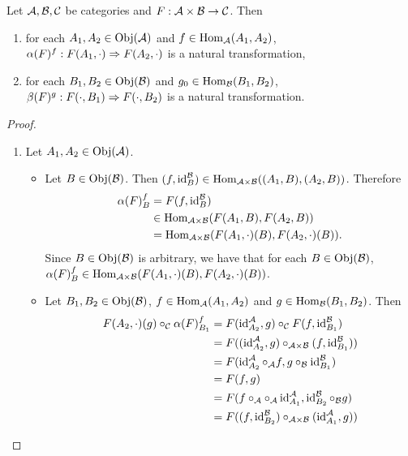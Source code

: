 \documentclass{book}
\begin{document}
	\begin{ex} 
		Let $\mathcal{A}, \mathcal{B}, \mathcal{C}$ be categories and $F :\mathcal{A} \times \mathcal{B} \rightarrow \mathcal{C}$. Then
		\begin{enumerate}
			\item for each $A_1, A_2 \in \operatorname{Obj}(\mathcal{A})$ and $f \in \operatorname{Hom}_{\mathcal{A}}(A_1, A_2)$, $\alpha(F)^f:F(A_1, \cdot) \Rightarrow F(A_2, \cdot)$ is a natural transformation,
			\item for each $B_1, B_2 \in \operatorname{Obj}(\mathcal{B})$ and $g_0 \in \operatorname{Hom}_{\mathcal{B}}(B_1, B_2)$, $\beta(F)^g:F(\cdot, B_1) \Rightarrow F(\cdot, B_2)$ is a natural transformation.
		\end{enumerate}
	\end{ex}
	
	\begin{proof}\
		\begin{enumerate}
			\item Let $A_1, A_2 \in \operatorname{Obj}(\mathcal{A})$.
			\begin{itemize}
				\item Let $B \in \operatorname{Obj}(\mathcal{B})$. Then $(f, \operatorname{id}_B^{\mathcal{B}}) \in \operatorname{Hom}_{\mathcal{A} \times \mathcal{B}}((A_1, B), (A_2, B))$. Therefore
				\begin{align*}
					\alpha(F)^f_B
					& = F(f, \operatorname{id}_B^{\mathcal{B}}) \\
					& \in \operatorname{Hom}_{\mathcal{A} \times \mathcal{B}}(F(A_1, B), F(A_2, B)) \\
					& = \operatorname{Hom}_{\mathcal{A} \times \mathcal{B}}(F(A_1, \cdot)(B), F(A_2, \cdot)(B)).
				\end{align*}
				Since $B \in \operatorname{Obj}(\mathcal{B})$ is arbitrary, we have that for each $B \in \operatorname{Obj}(\mathcal{B})$, $\alpha(F)^f_B \in \operatorname{Hom}_{\mathcal{A} \times \mathcal{B}}(F(A_1, \cdot)(B), F(A_2, \cdot)(B))$.
				\item Let $B_1, B_2 \in \operatorname{Obj}(\mathcal{B})$, $f \in \operatorname{Hom}_{\mathcal{A}}(A_1, A_2)$ and $g \in \operatorname{Hom}_{\mathcal{B}}(B_1, B_2)$. Then 
				\begin{align*}
					F(A_2, \cdot)(g) \circ_{\MC} \al(F)^f_{B_1} 
					& = F(\id_{A_2}^{\MA}, g) \circ_{\MC} F(f, \id_{B_1}^{\MB}) \\
					& = F((\id_{A_2}^{\MA}, g) \circ_{\MA \times \MB} (f, \id_{B_1}^{\MB})) \\
					& = F(\id_{A_2}^{\MA} \circ_{\MA} f, g \circ_{\MB} \id_{B_1}^{\MB}) \\
					& = F(f, g) \\
					& = F(f \circ_{\MA} \circ_{\MA} \id_{A_1}^{\MA}, \id_{B_2}^{\MB} \circ_{\MB} g) \\
					& = F((f, \id_{B_2}^{\MB}) \circ_{\MA \times \MB} (\id_{A_1}^{\MA}, g)) \\

\end{align*}
\end{itemize}
\end{enumerate}
\end{proof}
\end{document}
